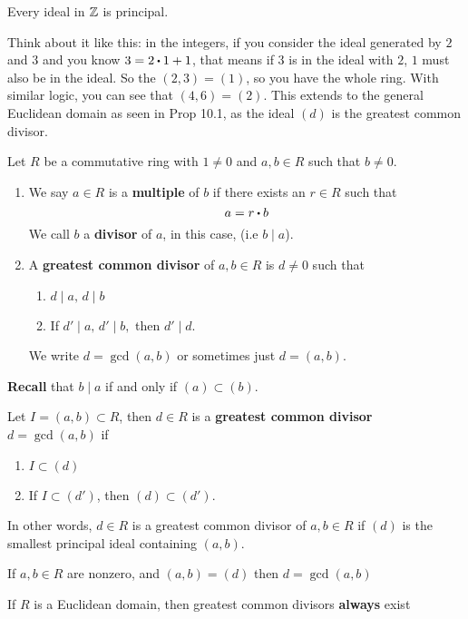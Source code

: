 \documentclass[../Main.tex]{subfiles}
\begin{document}
\begin{crl}[title= Ideals in \texorpdfstring{$\Z$}{TEXT} are principal]
	Every ideal in $\Z$ is principal.
\end{crl}
Think about it like this: in the integers, if you consider the ideal generated by $2$ and $3$ and you know $3=2\rdot 1+1$, that means if $3$ is in the ideal with $2$, $1$ must also be in the ideal. So the $(2,3)=(1)$, so you have the whole ring. With similar logic, you can see that $(4,6)=(2)$. This extends to the general Euclidean domain as seen in Prop 10.1, as the ideal $(d)$ is the greatest common divisor.
\begin{dfn}[title = {Multiple, Divisor, GCD}]
	Let $R$ be a commutative ring with $1\ne 0$ and $a,b\in R$ such that $b\ne 0$.
	\begin{enumerate}[label=(\arabic*)]
		\item We say $a\in R$ is a \textbf{multiple} of $b$ if there exists an $r\in R$ such that
		\[a=r\rdot b\]
		We call $b$ a \textbf{divisor} of $a$, in this case, (i.e $b\mid a$).
		\item A \textbf{greatest common divisor} of $a,b\in R$ is $d\ne 0$ such that
		\begin{enumerate}[label=(\roman*)]
			\item $d\mid a, \, d\mid b$
			\item If $d'\mid a,\,  d'\mid b,$ then $d'\mid d$.
		\end{enumerate}
		We write $d=\gcd(a,b)$ or sometimes just $d=(a,b)$.
	\end{enumerate}
\end{dfn}
\textbf{Recall} that $b\mid a$ if and only if $(a)\subset (b)$.
\begin{dfn}[title = Ideal GCD]
	Let $I = (a,b)\subset R$, then $d\in R$ is a \textbf{greatest common divisor} $d=\gcd(a,b)$ if
	\begin{enumerate}
		\item $I\subset (d)$
		\item If $I\subset (d')$, then $(d)\subset (d')$.
	\end{enumerate}
	In other words, $d\in R$ is a greatest common divisor of $a,b\in R$ if $(d)$ is the smallest principal ideal containing $(a,b)$.
\end{dfn}
\begin{prop}
	If $a,b\in R$ are nonzero, and $(a,b)=(d)$ then $d=\gcd(a,b)$
\end{prop}	
\begin{thm}[title = GCDs exist in Euclidean domains]
	If $R$ is a Euclidean domain, then greatest common divisors \textbf{always} exist
\end{thm}
\end{document}
